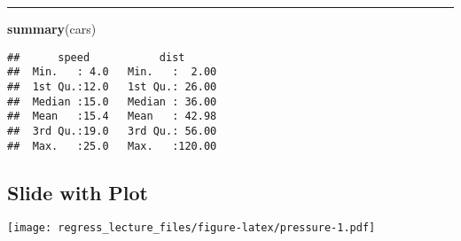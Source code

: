 \documentclass[
]{article}
\newenvironment{Shaded}{\begin{snugshade}}{\end{snugshade}}
\newcommand{\KeywordTok}[1]{\textcolor[rgb]{0.13,0.29,0.53}{\textbf{#1}}}
\newcommand{\NormalTok}[1]{#1}
\begin{document}
\begin{center}\rule{0.5\linewidth}{0.5pt}\end{center}

\begin{Shaded}
\begin{Highlighting}[]
\KeywordTok{summary}\NormalTok{(cars)}
\end{Highlighting}
\end{Shaded}

\begin{verbatim}
##      speed           dist       
##  Min.   : 4.0   Min.   :  2.00  
##  1st Qu.:12.0   1st Qu.: 26.00  
##  Median :15.0   Median : 36.00  
##  Mean   :15.4   Mean   : 42.98  
##  3rd Qu.:19.0   3rd Qu.: 56.00  
##  Max.   :25.0   Max.   :120.00
\end{verbatim}

\hypertarget{slide-with-plot}{%
\subsection{Slide with Plot}\label{slide-with-plot}}

\texttt{[image: regress\_lecture\_files/figure-latex/pressure-1.pdf]}
\end{document}
